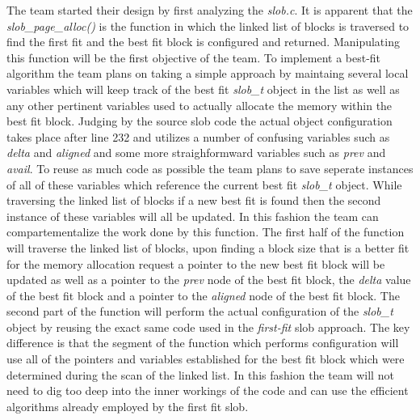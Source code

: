 \documentclass[10pt,onecolumn,draftclsnofoot]{IEEEtran} %
\begin{document}
\begin{singlespace}
  \normalfont \indent The team started their design by first analyzing the \textit{slob.c}. It is apparent that the \textit{slob\_page\_alloc()} is the function in which the linked list of blocks is traversed to find the first fit and the best fit block is configured and returned. Manipulating this function will be the first objective of the team. To implement a best-fit algorithm the team plans on taking a simple approach by maintaing several local variables which will keep track of the best fit \textit{slob\_t} object in the list as well as any other pertinent variables used to actually allocate the memory within the best fit block. Judging by the source slob code the actual object configuration takes place after line 232 and utilizes a number of confusing variables such as \textit{delta} and \textit{aligned} and some more straighformward variables such as \textit{prev} and \textit{avail}. To reuse as much code as possible the team plans to save seperate instances of all of these variables which reference the current best fit \textit{slob\_t} object. While traversing the linked list of blocks if a new best fit is found then the second instance of these variables will all be updated. In this fashion the team can compartementalize the work done by this function. The first half of the function will traverse the linked list of blocks, upon finding a block size that is a better fit for the memory allocation request a pointer to the new best fit block will be updated as well as a pointer to the \textit{prev} node of the best fit block, the \textit{delta} value of the best fit block and a pointer to the \textit{aligned} node of the best fit block. The second part of the function will perform the actual configuration of the \textit{slob\_t} object by reusing the exact same code used in the \textit{first-fit} slob approach. The key difference is that the segment of the function which performs configuration will use all of the  pointers and variables established for the best fit block which were determined during the scan of the linked list. In this fashion the team will not need to dig too deep into the inner workings of the code and can use the efficient algorithms already employed by the first fit slob.   

\end{singlespace}
\end{document}
